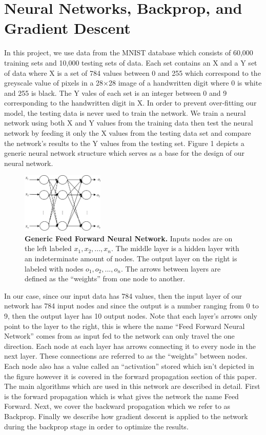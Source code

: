 \documentclass[12pt]{article}
\theoremstyle{definition}
\theoremstyle{plain}
\begin{document}
\section{Neural Networks, Backprop, and Gradient Descent}
In this project, we use data from the MNIST database which consists of 60,000 training sets and 10,000 testing sets of data\cite{mnist}. Each set contains an X and a Y set of data where X is a set of 784 values between 0 and 255 which correspond to the greyscale value of pixels in a 28$\times$28 image of a handwritten digit where 0 is white and 255 is black. The Y vales of each set is an integer between 0 and 9 corresponding to the handwritten digit in X. In order to prevent over-fitting our model, the testing data is never used to train the network. We train a neural network using both X and Y values from the training data then test the neural network by feeding it only the X values from the testing data set and compare the network's results to the Y values from the testing set. Figure 1 depicts a generic neural network structure which serves as a base for the design of our neural network.
\begin{figure}
	\centering
	\includegraphics[width=0.35\textwidth]{Images/FFNN.jpg}
	\caption{\textbf{Generic Feed Forward Neural Network.} Inputs nodes are on the left labeled $x_1,x_2,...,x_n$. The middle layer is a hidden layer with an indeterminate amount of nodes. The output layer on the right is labeled with nodes $o_1,o_2,...,o_n$. The arrows between layers are defined as the ``weights'' from one node to another.}
	\label{fig:FFNN}
\end{figure}
In our case, since our input data has 784 values, then the input layer of our network has 784 input nodes and since the output is a number ranging from 0 to 9, then the output layer has 10 output nodes. Note that each layer's arrows only point to the layer to the right, this is where the name ``Feed Forward Neural Network'' comes from as input fed to the network can only travel the one direction. Each node at each layer has arrows connecting it to every node in the next layer. These connections are referred to as the ``weights'' between nodes. Each node also has a value called an ``activation'' stored which isn't depicted in the figure however it is covered in the forward propagation section of this paper. The main algorithms which are used in this network are described in detail. First is the forward propagation which is what gives the network the name Feed Forward. Next, we cover the backward propagation which we refer to as Backprop. Finally we describe how gradient descent is applied to the network during the backprop stage in order to optimize the results.
\end{document}
